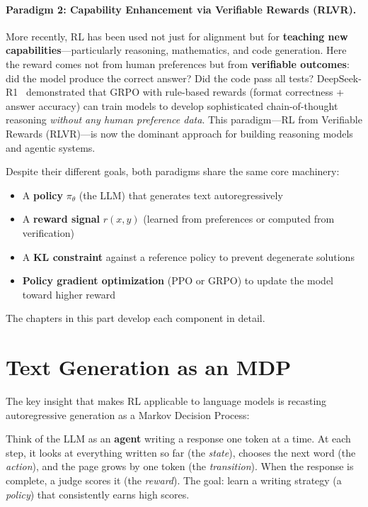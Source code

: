 \paragraph{Paradigm 2: Capability Enhancement via Verifiable Rewards (RLVR).}
More recently, RL has been used not just for alignment but for \textbf{teaching new capabilities}---particularly reasoning, mathematics, and code generation. Here the reward comes not from human preferences but from \textbf{verifiable outcomes}: did the model produce the correct answer? Did the code pass all tests? DeepSeek-R1~\cite{deepseek2025r1} demonstrated that GRPO with rule-based rewards (format correctness + answer accuracy) can train models to develop sophisticated chain-of-thought reasoning \emph{without any human preference data}. This paradigm---RL from Verifiable Rewards (RLVR)---is now the dominant approach for building reasoning models and agentic systems.

\begin{keybox}
Despite their different goals, both paradigms share the same core machinery:
\begin{itemize}
  \item A \textbf{policy} $\pi_\theta$ (the LLM) that generates text autoregressively
  \item A \textbf{reward signal} $r(x, y)$ (learned from preferences or computed from verification)
  \item A \textbf{KL constraint} against a reference policy to prevent degenerate solutions
  \item \textbf{Policy gradient optimization} (PPO or GRPO) to update the model toward higher reward
\end{itemize}
The chapters in this part develop each component in detail.
\end{keybox}

\section{Text Generation as an MDP}
\label{text-generation-as-mdp}

The key insight that makes RL applicable to language models is recasting autoregressive generation as a Markov Decision Process:

\begin{intuitionbox}
Think of the LLM as an \textbf{agent} writing a response one token at a time. At each step, it looks at everything written so far (the \emph{state}), chooses the next word (the \emph{action}), and the page grows by one token (the \emph{transition}). When the response is complete, a judge scores it (the \emph{reward}). The goal: learn a writing strategy (a \emph{policy}) that consistently earns high scores.
\end{intuitionbox}

